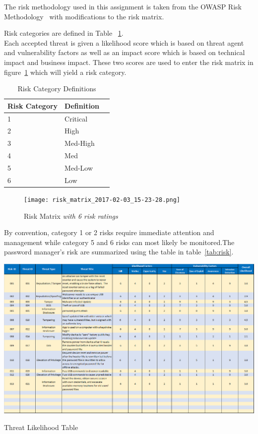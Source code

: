 
The risk methodology used in this assignment is taken from the OWASP Risk
Methodology~\cite{owasprisk} with modifications to the risk matrix.





Risk categories are defined in Table ~\ref{tab:risk_cat}.\\


Each accepted threat is given a likelihood score which is based on threat agent and vulnerability factors as well as an impact score which is based on technical impact and business impact.  These two scores are used to enter the risk matrix in figure~\ref{fig:riskmatrix} which will yield a risk category.

\begin{table}[h]
    \centering
    \begin{tabular}{l l l }
    \hline
    Risk Category & Definition \\
    \hline
    1 & Critical\\
    2 & High\\
    3 & Med-High\\
    4 & Med\\
    5 & Med-Low\\
    6 & Low \\
    \end{tabular}
    \caption{Risk Category Definitions}
    \label{tab:risk_cat}
\end{table}

\begin{figure}[]
    \centering
    \texttt{[image: risk\_matrix\_2017-02-03\_15-23-28.png]}
    \caption{Risk Matrix\emph{ with 6 risk ratings}}
    \label{fig:riskmatrix}
\end{figure}

By convention, category 1 or 2 risks require immediate attention and management
while category 5 and 6 risks can most likely be monitored.The password manager's risk are summarized using the table in table~\ref{tab:risk}.


\begin{table}
    \includegraphics[]{owasp_likelihood}
    \caption{Threat Likelihood Table}
    \label{tab:likelihood}
\end{table}

